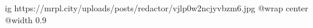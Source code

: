  
 
 
 
 

\ifcmt
  ig https://mrpl.city/uploads/posts/redactor/vjlp0w2ncjyvbzm6.jpg
  @wrap center
  @width 0.9
\fi
